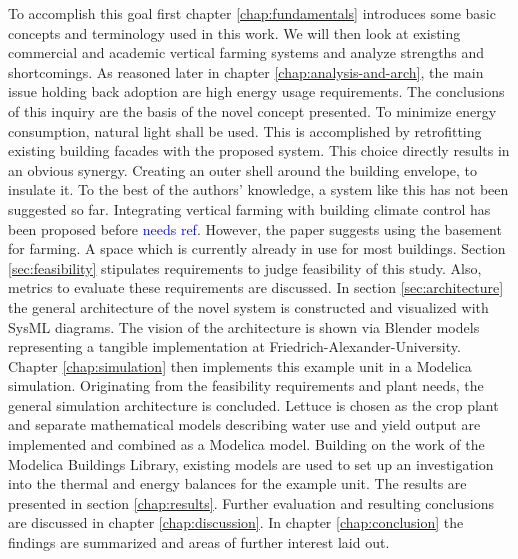 To accomplish this goal first chapter \ref{chap:fundamentals} introduces some basic concepts and terminology used in this work.
We will then look at existing commercial and academic vertical farming systems and analyze strengths and shortcomings.
As reasoned later in chapter \ref{chap:analysis-and-arch}, the main issue holding back adoption are high energy usage requirements.
The conclusions of this inquiry are the basis of the novel concept presented.
To minimize energy consumption, natural light shall be used.
This is accomplished by retrofitting existing building facades with the proposed system.
This choice directly results in an obvious synergy.
Creating an outer shell around the building envelope, to insulate it.
To the best of the authors' knowledge, a system like this has not been suggested so far.
Integrating vertical farming with building climate control has been proposed before \textcolor{blue}{needs ref}.
However, the paper suggests using the basement for farming.
A space which is currently already in use for most buildings.
Section \ref{sec:feasibility} stipulates requirements to judge feasibility of this study.
Also, metrics to evaluate these requirements are discussed.
In section \ref{sec:architecture} the general architecture of the novel system is constructed and visualized with SysML diagrams.
The vision of the architecture is shown via Blender models representing a tangible implementation at Friedrich-Alexander-University.
Chapter \ref{chap:simulation} then implements this example unit in a Modelica simulation.
Originating from the feasibility requirements and plant needs, the general simulation architecture is concluded.
Lettuce is chosen as the crop plant and separate mathematical models describing water use and yield output are implemented and combined as a Modelica model.
Building on the work of the Modelica Buildings Library, existing models are used to set up an investigation into the thermal and energy balances for the example unit.
The results are presented in section \ref{chap:results}.
Further evaluation and resulting conclusions are discussed in chapter \ref{chap:discussion}.
In chapter \ref{chap:conclusion} the findings are summarized and areas of further interest laid out.


